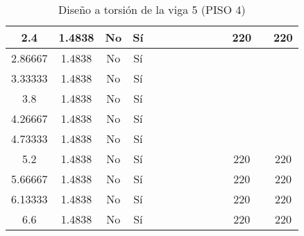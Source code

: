 \begin{table}[H]
{\begin{tabular}{|c|c|c|c|c|c|c|c|c|c|c|c|c|c|}
\hline
2.4 & 1.4838 & No  & Sí  &     &     &     &     &     &     &     & 220 &     & 220 \bigstrut\\
\hline
2.86667 & 1.4838 & No  & Sí  &     &     &     &     &     &     &     &     &     &  \bigstrut\\
\hline
3.33333 & 1.4838 & No  & Sí  &     &     &     &     &     &     &     &     &     &  \bigstrut\\
\hline
3.8 & 1.4838 & No  & Sí  &     &     &     &     &     &     &     &     &     &  \bigstrut\\
\hline
4.26667 & 1.4838 & No  & Sí  &     &     &     &     &     &     &     &     &     &  \bigstrut\\
\hline
4.73333 & 1.4838 & No  & Sí  &     &     &     &     &     &     &     &     &     &  \bigstrut\\
\hline
5.2 & 1.4838 & No  & Sí  &     &     &     &     &     &     &     & 220 &     & 220 \bigstrut\\
\hline
5.66667 & 1.4838 & No  & Sí  &     &     &     &     &     &     &     & 220 &     & 220 \bigstrut\\
\hline
6.13333 & 1.4838 & No  & Sí  &     &     &     &     &     &     &     & 220 &     & 220 \bigstrut\\
\hline
6.6 & 1.4838 & No  & Sí  &     &     &     &     &     &     &     & 220 &     & 220 \bigstrut\\
\hline
\end{tabular}%
  }
      \caption{Diseño a torsión de la viga 5 (PISO 4) }
  \label{tab:T VG5 P4 }%
\end{table}%
